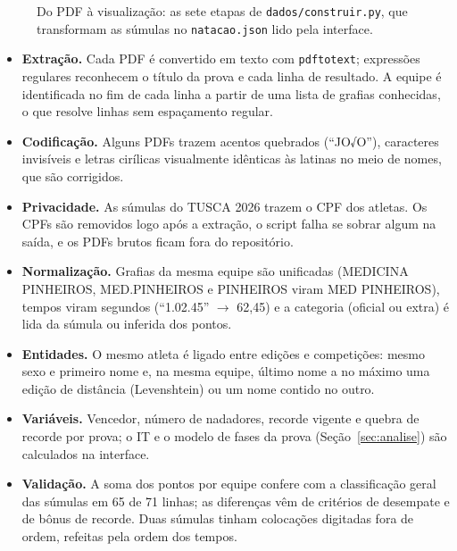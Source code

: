 \documentclass[11pt,a4paper]{article}
\begin{document}
\begin{figure}[H]
{}
\caption{Do PDF à visualização: as sete etapas de \texttt{dados/construir.py}, que transformam as súmulas no
\texttt{natacao.json} lido pela interface.}
\label{fig:pipeline}
\end{figure}

\begin{itemize}[leftmargin=1.2em]
  \item \textbf{Extração.} Cada PDF é convertido em texto com \texttt{pdftotext}; expressões regulares reconhecem o
  título da prova e cada linha de resultado. A equipe é identificada no fim de cada linha a partir de uma lista
  de grafias conhecidas, o que resolve linhas sem espaçamento regular.
  \item \textbf{Codificação.} Alguns PDFs trazem acentos quebrados (``JO√O''), caracteres invisíveis e letras
  cirílicas visualmente idênticas às latinas no meio de nomes, que são corrigidos.
  \item \textbf{Privacidade.} As súmulas do TUSCA 2026 trazem o CPF dos atletas. Os CPFs são removidos logo após a
  extração, o script falha se sobrar algum na saída, e os PDFs brutos ficam fora do repositório.
  \item \textbf{Normalização.} Grafias da mesma equipe são unificadas (MEDICINA PINHEIROS, MED.PINHEIROS e
  PINHEIROS viram MED PINHEIROS), tempos viram segundos (``1.02.45'' $\to$ 62{,}45) e a categoria (oficial ou
  extra) é lida da súmula ou inferida dos pontos.
  \item \textbf{Entidades.} O mesmo atleta é ligado entre edições e competições: mesmo sexo e primeiro nome e,
  na mesma equipe, último nome a no máximo uma edição de distância (Levenshtein) ou um nome contido no outro.
  \item \textbf{Variáveis.} Vencedor, número de nadadores, recorde vigente e quebra de recorde por prova; o IT e o
  modelo de fases da prova (Seção~\ref{sec:analise}) são calculados na interface.
  \item \textbf{Validação.} A soma dos pontos por equipe confere com a classificação geral das súmulas em 65 de 71
  linhas; as diferenças vêm de critérios de desempate e de bônus de recorde. Duas súmulas tinham colocações
  digitadas fora de ordem, refeitas pela ordem dos tempos.
\end{itemize}
\end{document}
